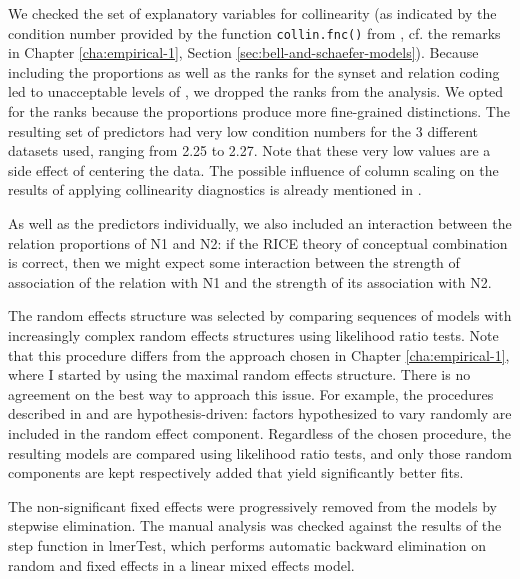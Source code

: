 We checked the set of explanatory variables for collinearity (as
indicated by the condition number provided by the function
\texttt{collin.fnc()} from \citealt{languageR}, cf. the remarks in Chapter
\ref{cha:empirical-1}, Section
\ref{sec:bell-and-schaefer-models}). 
Because including the proportions
as well as the ranks for the synset and relation coding led to
unacceptable levels of , we dropped the ranks from the
analysis. We opted for the ranks because the proportions produce more
fine-grained distinctions. The resulting set of predictors had very
low condition numbers for the 3 different datasets used, ranging from
2.25 to 2.27. Note that these very low values are a side effect of
centering the data. The possible influence of column scaling on the
results of applying collinearity diagnostics is already mentioned in
\citet[183]{Belsleyetal:1980}.

As well as the predictors individually, we also included
an interaction between the relation proportions of N1 and N2: if the
RICE theory of conceptual combination \citep{Spaldingetal:2010} is
correct, then we might expect some interaction between the strength of
association of the relation with N1 and the strength of its
association with N2. 

\enlargethispage{1\baselineskip}
The random effects structure was selected by comparing sequences of
models with increasingly complex random effects structures using
likelihood ratio tests. Note that this procedure differs from the
approach chosen in Chapter \ref{cha:empirical-1}, where I started by
using the maximal random effects structure. There is no agreement on
the best way to approach this issue. For example, the procedures
described in \citet[cf. especially the remark
on page 393]{Baayenetal:2008} %
and \citet[Section 7.1]{Baayen:2008a} are hypothesis-driven: factors hypothesized to vary
randomly are included in the
random effect component. 
Regardless of
the chosen procedure, the resulting models are compared using
likelihood ratio tests, and only those random components are kept
respectively added that yield significantly better fits. 

The non-significant fixed effects were
progressively removed from the models by stepwise elimination. The
manual analysis was checked against the results of the step function
in lmerTest, which performs automatic backward elimination on random
and fixed effects in a linear mixed effects model.

